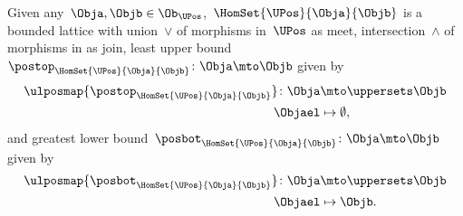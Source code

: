 \begin{lemma}
    \label{lem:UPos-is-bounded-lattice}
    Given any~$\Obja,\Objb\in \Ob_\UPos$,~$\HomSet{\UPos}{\Obja}{\Objb}$ is a bounded lattice with union~$\vee$ of morphisms in~$\UPos$ as meet, intersection~$\wedge$ of morphisms in \UPos as join, least upper bound~$\postop_{\HomSet{\UPos}{\Obja}{\Objb}}\colon \Obja \mto \Objb$ given by
    \begin{equation*}
        \begin{aligned}
            \ulposmap{\postop_{\HomSet{\UPos}{\Obja}{\Objb}}}\colon \Obja &\mto \uppersets \Objb\\
            \Objael &\mapsto \emptyset,
        \end{aligned}
    \end{equation*}
    and greatest lower bound~$\posbot_{\HomSet{\UPos}{\Obja}{\Objb}}\colon \Obja \mto \Objb$ given by
    \begin{equation*}
        \begin{aligned}
            \ulposmap{\posbot_{\HomSet{\UPos}{\Obja}{\Objb}}}\colon \Obja &\mto \uppersets \Objb\\
            \Objael &\mapsto \Objb.
        \end{aligned}
    \end{equation*}
\end{lemma}
